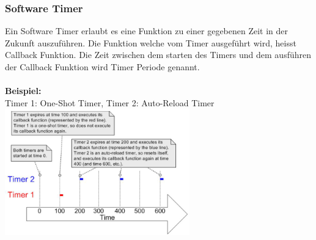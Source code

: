 \subsubsection{Software Timer}
Ein Software Timer erlaubt es eine Funktion zu einer gegebenen Zeit in der Zukunft auszuführen. Die Funktion welche vom Timer ausgeführt wird, heisst Callback Funktion. Die Zeit zwischen dem starten des Timers und dem ausführen der Callback Funktion wird Timer Periode genannt. \\ \\
\textbf{Beispiel:}\\
Timer 1: One-Shot Timer, Timer 2: Auto-Reload Timer \\
\includegraphics[width=0.6\textwidth]{images/Betriebssysteme/freertos_timer.png}